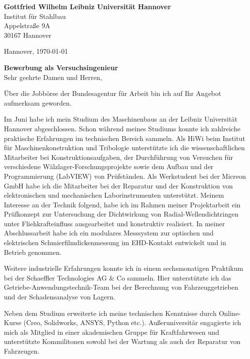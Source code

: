 \documentclass[11pt,a4paper]{article}
\newcommand{\FirmaName}{Gottfried Wilhelm Leibniz Universität Hannover}
\newcommand{\FirmaAdresseLineOne}{Appelstraße 9A}
\newcommand{\FirmaAdresseLineTwo}{30167 Hannover}
\newcommand{\AnsprechpartnerVoll}{Herrn Eschenhorn}
\newcommand{\Ansprechpartner}{Eschenhorn}
\newcommand{\Ansprechpartnerin}{Köllmann}
\newcommand{\JobName}{Versuchsingenieur}
\begin{document}
\begin{flushleft}
    \textbf{\FirmaName}\\
    Institut für Stahlbau\\
    \FirmaAdresseLineOne\\
    \FirmaAdresseLineTwo\\
\end{flushleft}

\begin{flushright}
    Hannover, \today
\end{flushright}

\textbf{Bewerbung als \JobName}\\

Sehr geehrte Damen und Herren,

Über die Jobbörse der Bundesagentur für Arbeit bin ich auf Ihr Angebot aufmerksam geworden.

Im Juni habe ich mein Studium des Maschinenbaus an der Leibniz Universität Hannover abgeschlossen.
Schon während meines Studiums konnte ich zahlreiche praktische Erfahrungen im technischen Bereich sammeln.
Als HiWi beim Institut für Maschinenkonstruktion und Tribologie unterstützte ich die wissenschaftlichen Mitarbeiter bei Konstruktionsaufgaben, der Durchführung von Versuchen für verschiedene Wälzlager-Forschungsprojekte sowie dem Aufbau und der Programmierung (LabVIEW) von Prüfständen.
Als Werkstudent bei der Micreon GmbH habe ich die Mitarbeiter bei der Reparatur und der Konstruktion von elektronischen und mechanischen Laborinstrumenten unterstützt.
Meinem Interesse an der Technik folgend, habe ich im Rahmen meiner Projektarbeit ein Prüfkonzept zur Untersuchung der Dichtwirkung von Radial-Wellendichtringen unter Fliehkrafteinfluss ausgearbeitet und konstruktiv realisiert.
In meiner Abschlussarbeit habe ich ein modulares Messsystem zur optischen und elektrischen Schmierfilmdickenmessung im EHD-Kontakt entwickelt und in Betrieb genommen.

Weitere industrielle Erfahrungen konnte ich in einem sechsmonatigen Praktikum bei der Schaeffler Technologies AG \& Co sammeln.
Hier unterstützte ich das Getriebe-Anwendungstechnik-Team bei der Berechnung von Fahrzeuggetrieben und der Schadensanalyse von Lagern.

Neben dem Studium erweiterte ich meine technischen Kenntnisse durch Online-Kurse (Creo, Solidworks, ANSYS, Python etc.).
Außeruniversitär engagierte ich mich als Mitglied in einer akademischen Gruppe für Kraftfahrwesen und unterstützte Kommilitonen sowohl bei der Wartung als auch der Reparatur von Fahrzeugen.
\end{document}
